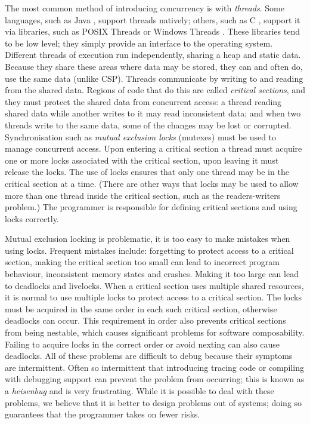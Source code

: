 The most common method of introducing concurrency is with \emph{threads}.
Some languages, such as Java \citep{java-threads}, 
support threads natively; 
others, such as C \citep{c}, support it via libraries,
such as
POSIX Threads \citep{butenhof1997:pthreads} or Windows
Threads \citep{winthreads}.
These libraries tend to be low level;
they simply provide an interface to the operating system.
Different threads of execution run independently,
sharing a heap and static data.
Because they share these areas where data may be stored,
they can and often do,
use the same data (unlike CSP).
Threads communicate by writing to and reading from the shared data.
Regions of code that do this are called \emph{critical sections},
and they must protect the shared data from concurrent access:
a thread reading shared data while another writes to it may read
inconsistent data;
and when two threads write to the same data,
some of the changes may be lost or corrupted.
Synchronisation such as \emph{mutual exclusion locks} (mutexes)
\citep{Dijkstra:Mutex} must be used to manage concurrent access.
Upon entering a critical section a thread must acquire one or more locks
associated with the critical section,
upon leaving it must release the locks.
The use of locks ensures that only one thread may be in the critical section
at a time.
(There are other ways that locks may be used to allow more than one thread
inside the critical section, such as the readers-writers problem.)
The programmer is responsible for defining critical sections and using locks
correctly.

Mutual exclusion locking is problematic,
it is too easy to make mistakes when using locks.
Frequent mistakes include: forgetting to protect access to a critical
section,
making the critical section too small
can lead to incorrect program behaviour, inconsistent memory states and
crashes.
Making it too large can lead to deadlocks and livelocks.
When a critical section uses multiple shared resources,
it is normal to use multiple locks to protect access to a critical section.
The locks must be acquired in the same order in each such critical section,
otherwise deadlocks can occur.
This requirement in order also prevents critical sections from being
nestable,
which causes significant problems for software composability.
Failing to acquire locks in the correct order or avoid nexting can also cause
deadlocks.
All of these problems are difficult to debug because their symptoms are
intermittent.
Often so intermittent that introducing tracing code or compiling with debugging
support can prevent the problem from occurring;
this is known as a \emph{heisenbug} and is very frustrating.
While it is possible to deal with these problems,
we believe that it is better to design problems out of systems;
doing so guarantees that the programmer takes on fewer risks.

